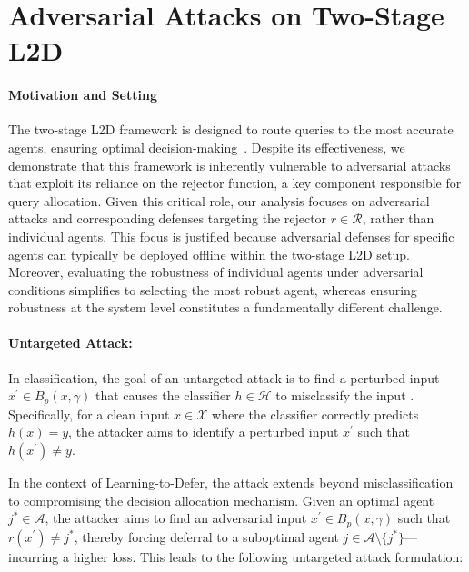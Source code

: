 \section{Adversarial Attacks on Two-Stage L2D}\label{section:attacks}

\paragraph{Motivation and Setting}  \label{motivation}
The two-stage L2D framework is designed to route queries to the most accurate agents, ensuring optimal decision-making~\cite{mao2023twostage, mao2024regressionmultiexpertdeferral, montreuil2024twostagelearningtodefermultitasklearning}. Despite its effectiveness, we demonstrate that this framework is inherently vulnerable to adversarial attacks that exploit its reliance on the rejector function, a key component responsible for query allocation. Given this critical role, our analysis focuses on adversarial attacks and corresponding defenses targeting the rejector \( r \in \mathcal{R} \), rather than individual agents. This focus is justified because adversarial defenses for specific agents can typically be deployed offline within the two-stage L2D setup. Moreover, evaluating the robustness of individual agents under adversarial conditions simplifies to selecting the most robust agent, whereas ensuring robustness at the system level constitutes a fundamentally different challenge.



\paragraph{Untargeted Attack:} 
In classification, the goal of an untargeted attack is to find a perturbed input \( x^\prime \in B_p(x, \gamma) \) that causes the classifier \( h \in \mathcal{H} \) to misclassify the input \citep{goodfellow2014explaining, akhtar2018threat}. Specifically, for a clean input \( x \in \mathcal{X} \) where the classifier correctly predicts \( h(x) = y \), the attacker aims to identify a perturbed input \( x^\prime \) such that \( h(x^\prime) \neq y \).

In the context of Learning-to-Defer, the attack extends beyond misclassification to compromising the decision allocation mechanism. Given an optimal agent \( j^\ast \in \mathcal{A} \), the attacker aims to find an adversarial input \( x^\prime \in B_p(x, \gamma) \) such that \( r(x^\prime) \neq j^\ast \), thereby forcing deferral to a suboptimal agent \( j \in \mathcal{A} \setminus \{ j^\ast \} \)---incurring a higher loss. This leads to the following untargeted attack formulation:

